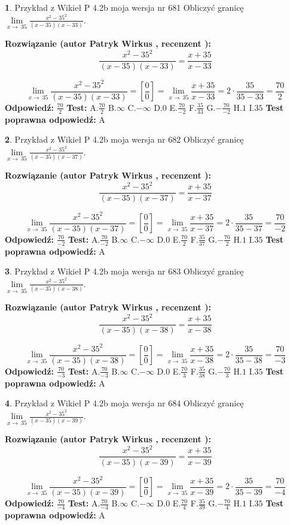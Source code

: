 \documentclass[12pt, a4paper]{article}
\theoremstyle{definition} %
\newtheorem{zad}{}
\newcommand{\zadStart}[1]{\begin{zad}#1\newline}
\newcommand{\zadStop}{\end{zad}}
\newcommand{\rozwStart}[2]{\noindent \textbf{Rozwiązanie (autor #1 , recenzent #2): }\newline}
\newcommand{\rozwStop}{\newline}
\newcommand{\odpStart}{\noindent \textbf{Odpowiedź:}\newline}
\newcommand{\odpStop}{\newline}
\newcommand{\testStart}{\noindent \textbf{Test:}\newline}
\newcommand{\testStop}{\newline}
\newcommand{\kluczStart}{\noindent \textbf{Test poprawna odpowiedź:}\newline}
\newcommand{\kluczStop}{\newline}
\begin{document}
\zadStart{Przykład z Wikieł P 4.2b moja wersja nr 681}
Obliczyć granicę $\lim\limits_{x\to\ 35}\frac{x^{2}-35^{2}}{(x-35)(x-33)}$.
\zadStop
\rozwStart{Patryk Wirkus}{}
$$\frac{x^{2}-35^{2}}{(x-35)(x-33)}=\frac{x+35}{x-33}$$

$$\lim\limits_{x\to\ 35}\frac{x^{2}-35^{2}}{(x-35)(x-33)}=[\frac{0}{0}]=\lim\limits_{x\to\ 35}\frac{x+35}{x-33}=2 \cdot \frac{35}{35-33} = \frac{70}{2}$$
\rozwStop
\odpStart
$\frac{70}{2}$
\odpStop
\testStart
A.$\frac{70}{2}$
B.$\infty$
C.$-\infty$
D.$0$
E.$\frac{70}{-2}$
F.$\frac{35}{33}$
G.$-\frac{70}{-2}$
H.$1$
I.$35$
\testStop
\kluczStart
A
\kluczStop



\zadStart{Przykład z Wikieł P 4.2b moja wersja nr 682}
Obliczyć granicę $\lim\limits_{x\to\ 35}\frac{x^{2}-35^{2}}{(x-35)(x-37)}$.
\zadStop
\rozwStart{Patryk Wirkus}{}
$$\frac{x^{2}-35^{2}}{(x-35)(x-37)}=\frac{x+35}{x-37}$$

$$\lim\limits_{x\to\ 35}\frac{x^{2}-35^{2}}{(x-35)(x-37)}=[\frac{0}{0}]=\lim\limits_{x\to\ 35}\frac{x+35}{x-37}=2 \cdot \frac{35}{35-37} = \frac{70}{-2}$$
\rozwStop
\odpStart
$\frac{70}{-2}$
\odpStop
\testStart
A.$\frac{70}{-2}$
B.$\infty$
C.$-\infty$
D.$0$
E.$\frac{70}{2}$
F.$\frac{35}{37}$
G.$-\frac{70}{2}$
H.$1$
I.$35$
\testStop
\kluczStart
A
\kluczStop



\zadStart{Przykład z Wikieł P 4.2b moja wersja nr 683}
Obliczyć granicę $\lim\limits_{x\to\ 35}\frac{x^{2}-35^{2}}{(x-35)(x-38)}$.
\zadStop
\rozwStart{Patryk Wirkus}{}
$$\frac{x^{2}-35^{2}}{(x-35)(x-38)}=\frac{x+35}{x-38}$$

$$\lim\limits_{x\to\ 35}\frac{x^{2}-35^{2}}{(x-35)(x-38)}=[\frac{0}{0}]=\lim\limits_{x\to\ 35}\frac{x+35}{x-38}=2 \cdot \frac{35}{35-38} = \frac{70}{-3}$$
\rozwStop
\odpStart
$\frac{70}{-3}$
\odpStop
\testStart
A.$\frac{70}{-3}$
B.$\infty$
C.$-\infty$
D.$0$
E.$\frac{70}{3}$
F.$\frac{35}{38}$
G.$-\frac{70}{3}$
H.$1$
I.$35$
\testStop
\kluczStart
A
\kluczStop



\zadStart{Przykład z Wikieł P 4.2b moja wersja nr 684}
Obliczyć granicę $\lim\limits_{x\to\ 35}\frac{x^{2}-35^{2}}{(x-35)(x-39)}$.
\zadStop
\rozwStart{Patryk Wirkus}{}
$$\frac{x^{2}-35^{2}}{(x-35)(x-39)}=\frac{x+35}{x-39}$$

$$\lim\limits_{x\to\ 35}\frac{x^{2}-35^{2}}{(x-35)(x-39)}=[\frac{0}{0}]=\lim\limits_{x\to\ 35}\frac{x+35}{x-39}=2 \cdot \frac{35}{35-39} = \frac{70}{-4}$$
\rozwStop
\odpStart
$\frac{70}{-4}$
\odpStop
\testStart
A.$\frac{70}{-4}$
B.$\infty$
C.$-\infty$
D.$0$
E.$\frac{70}{4}$
F.$\frac{35}{39}$
G.$-\frac{70}{4}$
H.$1$
I.$35$
\testStop
\kluczStart
A
\kluczStop
\end{document}
